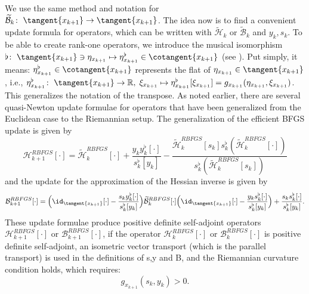 We use the same method and notation for $\widetilde{\mathcal{B}}_k \colon \; \tangent{x_{k+1}} \to \tangent{x_{k+1}}$. The idea now is to find a convenient update formula for operators, which can be written with $\widetilde{\mathcal{H}}_k$ or $\widetilde{\mathcal{B}}_k$ and $y_k,s_k$. To be able to create rank-one operators, we introduce the musical isomorphism $\flat \colon \; \tangent{x_{k+1}} \ni \eta_{x_{k+1}} \mapsto \eta^{\flat}_{x_{k+1}} \in \cotangent{x_{k+1}}$ (see ). Put simply, it means: $\eta^{\flat}_{x_{k+1}} \in \cotangent{x_{k+1}}$ represents the ﬂat of $\eta_{x_{k+1}} \in \tangent{x_{k+1}}$, i.e., $\eta^{\flat}_{x_{k+1}} \colon \; \tangent{x_{k+1}} \to \mathbb{R}, \;  \xi_{x_{k+1}} \mapsto \eta^{\flat}_{x_{k+1}}[\xi_{x_{k+1}}] = g_{x_{k+1}} (\eta_{x_{k+1}}, \xi_{x_{k+1}})$. This generalizes the notation of the transpose. As noted earlier, there are several quasi-Newton update formulae for operators that have been generalized from the Euclidean case to the Riemannian setup. The generalization of the efficient BFGS update is given by
\begin{equation}\label{directRiemannianBFGSFormula}
    \mathcal{H}^{RBFGS}_{k+1} [\cdot] = \widetilde{\mathcal{H}}^{RBFGS}_k [\cdot] + \frac{y_k y^{\flat}_k[\cdot]}{s^{\flat}_k [y_k]} - \frac{\widetilde{\mathcal{H}}^{RBFGS}_k [s_k] s^{\flat}_k (\widetilde{\mathcal{H}}^{RBFGS}_k [\cdot])}{s^{\flat}_k (\widetilde{\mathcal{H}}^{RBFGS}_k [s_k])}
\end{equation}
and the update for the approximation of the Hessian inverse is given by
\begin{equation}\label{RiemannianInverseBFGSFormula}
        \mathcal{B}^{RBFGS}_{k+1} [\cdot] = \Big{(} \id_{\tangent{x_{k+1}}}[\cdot] - \frac{s_k y^{\flat}_k [\cdot]}{s^{\flat}_k [y_k]} \Big{)} \widetilde{\mathcal{B}}^{RBFGS}_k [\cdot] \Big{(} \id_{\tangent{x_{k+1}}}[\cdot] - \frac{y_k s^{\flat}_k [\cdot]}{s^{\flat}_k [y_k]} \Big{)} + \frac{s_k s^{\flat}_k [\cdot]}{s^{\flat}_k [y_k]}.
\end{equation}
These update formulae produce positive definite self-adjoint operators $\mathcal{H}^{RBFGS}_{k+1} [\cdot]$ or $\mathcal{B}^{RBFGS}_{k+1} [\cdot]$, if the operator $\mathcal{H}^{RBFGS}_k [\cdot]$ or $\mathcal{B}^{RBFGS}_k [\cdot]$ is positive definite self-adjoint, an isometric vector transport (which is the parallel transport) is used in the definitions of s,y and B, and the Riemannian curvature condition holds, which requires:
\begin{equation}\label{RiemannianCurvatureCondition}
    g_{x_{k+1}}(s_k,y_k) > 0.
\end{equation}
